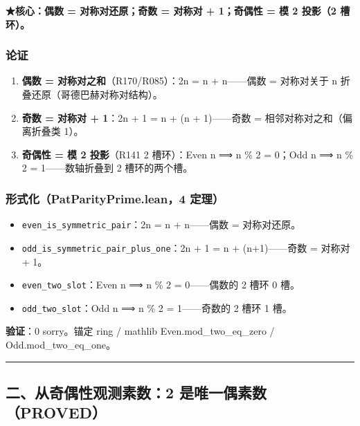 \documentclass[
]{article}
\providecommand{\tightlist}{%
 \setlength{\itemsep}{0pt}\setlength{\parskip}{0pt}}
\begin{document}
\textbf{★核心：偶数 = 对称对还原；奇数 = 对称对 + 1；奇偶性 = 模 2
投影（2 槽环）。}

\subsubsection{论证}\label{ux8bbaux8bc1}

\begin{enumerate}
\def\labelenumi{\arabic{enumi}.}
\tightlist
\item
 \textbf{偶数 = 对称对之和}（R170/R085）：2n = n + n------偶数 =
 对称对关于 n 折叠还原（哥德巴赫对称对结构）。
\item
 \textbf{奇数 = 对称对 + 1}：2n + 1 = n + (n + 1)------奇数 =
 相邻对称对之和（偏离折叠类 1）。
\item
 \textbf{奇偶性 = 模 2 投影}（R141 2 槽环）：Even n ⟹ n \% 2 = 0；Odd n
 ⟹ n \% 2 = 1------数轴折叠到 2 槽环的两个槽。
\end{enumerate}

\subsubsection{形式化（PatParityPrime.lean，4
定理）}\label{ux5f62ux5f0fux5316patparityprime.lean4-ux5b9aux7406}

\begin{itemize}
\tightlist
\item
 \texttt{even\_is\_symmetric\_pair}：2n = n + n------偶数 =
 对称对还原。
\item
 \texttt{odd\_is\_symmetric\_pair\_plus\_one}：2n + 1 = n +
 (n+1)------奇数 = 对称对 + 1。
\item
 \texttt{even\_two\_slot}：Even n ⟹ n \% 2 = 0------偶数的 2 槽环 0
 槽。
\item
 \texttt{odd\_two\_slot}：Odd n ⟹ n \% 2 = 1------奇数的 2 槽环 1 槽。
\end{itemize}

\textbf{验证}：0 sorry。锚定 ring / mathlib Even.mod\_two\_eq\_zero /
Odd.mod\_two\_eq\_one。

\begin{center}\rule{0.5\linewidth}{0.5pt}\end{center}

\subsection{二、从奇偶性观测素数：2
是唯一偶素数（PROVED）}\label{ux4e8cux4eceux5947ux5076ux6027ux89c2ux6d4bux7d20ux65702-ux662fux552fux4e00ux5076ux7d20ux6570proved}
\end{document}
